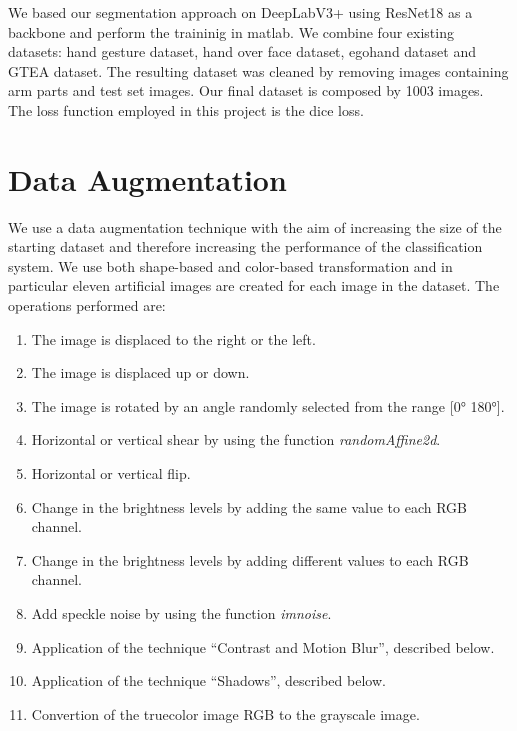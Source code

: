 We based our segmentation approach on DeepLabV3+ using ResNet18 as a backbone and perform the traininig in matlab. 
We combine four existing datasets: hand gesture dataset, hand over face dataset, egohand dataset and GTEA dataset. The resulting dataset was cleaned by removing images containing arm parts and test set images. Our final dataset is composed by 1003 images.
The loss function employed in this project is the dice loss.
\section{Data Augmentation}
We use a data augmentation technique with the aim of increasing the size of the starting dataset and therefore increasing the performance of the classification system. We use both shape-based and color-based transformation and in particular eleven artificial images are created for each image in the dataset. \newline The operations performed are:
\begin{enumerate}
    \item The image is displaced to the right or the left.
    \item The image is displaced up or down.
    \item The image is rotated by an angle randomly selected from the range [0° 180°].
    \item Horizontal or vertical shear by using the function \textit{randomAffine2d}.
    \item Horizontal or vertical flip.
    \item Change in the brightness levels by adding the same value to each RGB channel.
    \item Change in the brightness levels by adding different values to each RGB channel.
    \item Add speckle noise by using the function \textit{imnoise}.
    \item Application of the technique “Contrast and Motion Blur”, described below. 
    \item Application of the technique “Shadows”, described below. 
    \item  Convertion of the truecolor image RGB to the grayscale image.
\end{enumerate}
